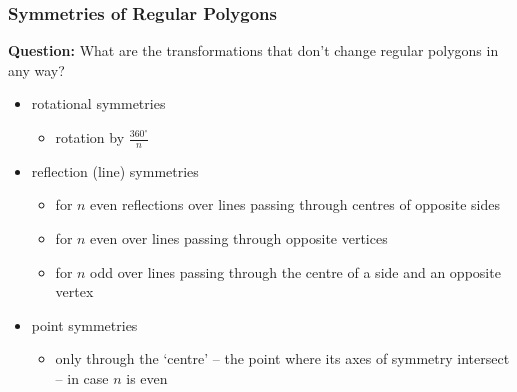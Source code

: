\documentclass[aspectratio=169,11pt,svgnames]{beamer}
\begin{document}
\begin{frame}
 \frametitle{Symmetries of Regular Polygons}
 \textbf{Question:} What are the transformations that don't change regular
 polygons in any way?
 \pause
 \begin{itemize}[label=\textbullet]
  \item<1-> rotational symmetries
  \begin{itemize}[label=$\circ$]
   \item<2-> rotation by $\frac{360^{ \circ }}{n}$
  \end{itemize}
 \item<3-> reflection (line) symmetries
  \begin{itemize}[label=$\circ$]
   \item<4-> for $n$ even reflections over lines passing through centres of opposite
    sides
   \item<4-> for $n$ even over lines passing through opposite vertices
   \item<4-> for $n$ odd over lines passing through the centre of a side and an
    opposite vertex
  \end{itemize}
 \item<5-> point symmetries
 \begin{itemize}[label=$\circ$]
  \item<6-> only through the `centre' -- the point where its axes of symmetry
   intersect -- in case $n$ is even
 \end{itemize}
 \end{itemize}
\end{frame}
\end{document}
